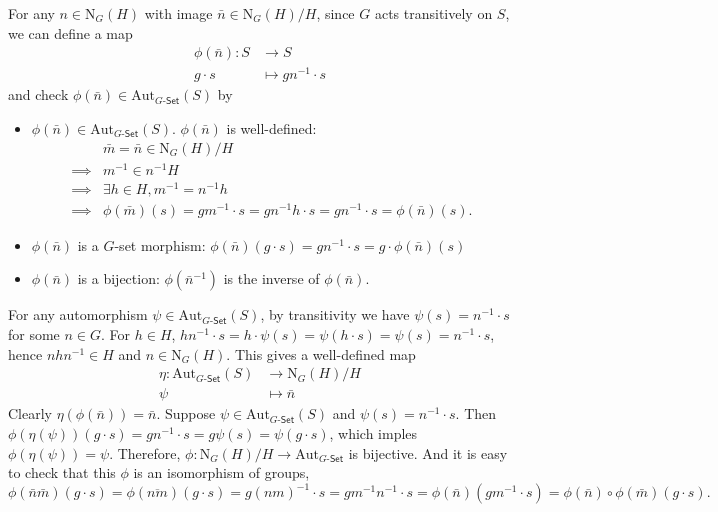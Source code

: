 \begin{prf}
    For any $n \in \mathrm{N}_G(H)$ with image $\bar{n} \in \mathrm{N}_G(H)/H$, since $G$ acts transitively on $S$, we can define a map
    \begin{align*}
        \phi(\bar{n}):S & \longrightarrow S          \\
        g\cdot s        & \longmapsto gn^{-1}\cdot s
    \end{align*}
    and check $\phi(\bar{n})\in\mathrm{Aut}_{G\text{-}\mathsf{Set}}(S)$ by
    \begin{itemize}
        \item $\phi(\bar{n})\in\mathrm{Aut}_{G\text{-}\mathsf{Set}}(S)$. $\phi(\bar{n})$ is well-defined:
              \begin{align*}
                           & \bar{m}=\bar{n}\in\mathrm{N}_G(H)/H                                              \\
                  \implies & m^{-1}\in n^{-1}H                                                                \\
                  \implies & \exists h\in H,m^{-1}=n^{-1}h                                                    \\
                  \implies & \phi(\bar{m})(s)=gm^{-1}\cdot s=gn^{-1}h\cdot s=gn^{-1}\cdot s=\phi(\bar{n})(s).
              \end{align*}
        \item $\phi(\bar{n})$ is a $G$-set morphism: $\phi(\bar{n})(g\cdot s)=gn^{-1}\cdot s=g\cdot\phi(\bar{n})(s)$
        \item $\phi(\bar{n})$ is a bijection: $\phi(\bar{n}^{-1})$ is the inverse of $\phi(\bar{n})$.
    \end{itemize}
    For any automorphism $\psi\in \mathrm{Aut}_{G\text{-}\mathsf{Set}}(S)$, by transitivity we have $\psi(s)=n^{-1}\cdot s$ for some $n \in G$. For $h \in H$, $hn^{-1}\cdot s=h\cdot\psi(s)=\psi(h\cdot s)=\psi(s)=n^{-1}\cdot s$, hence $n h n^{-1} \in H$ and $n \in \mathrm{N}_G(H)$. This gives a well-defined map
    \begin{align*}
        \eta:\mathrm{Aut}_{G\text{-}\mathsf{Set}}(S) & \longrightarrow \mathrm{N}_G(H)/H \\
        \psi                                         & \longmapsto \bar{n}
    \end{align*}
    Clearly $\eta(\phi(\bar{n}))=\bar{n}$. Suppose $\psi\in\mathrm{Aut}_{G\text{-}\mathsf{Set}}(S)$ and $\psi(s)=n^{-1}\cdot s$. Then $\phi(\eta(\psi))(g\cdot s)=g n^{-1}\cdot s=g\psi(s)=\psi(g\cdot s)$, which imples $\phi(\eta(\psi))=\psi$. Therefore, $\phi:\mathrm{N}_G(H)/H\to\mathrm{Aut}_{G\text{-}\mathsf{Set}}$ is bijective. And it is easy to check that this $\phi$ is an isomorphism of groups,
    \[
        \phi(\bar{n}\bar{m})(g\cdot s)=\phi(\overline{nm})(g\cdot s)=g(nm)^{-1}\cdot s=gm^{-1}n^{-1}\cdot s=\phi(\bar{n})(gm^{-1}\cdot s)=\phi(\bar{n})\circ\phi(\bar{m})(g\cdot s).
    \]
\end{prf}





